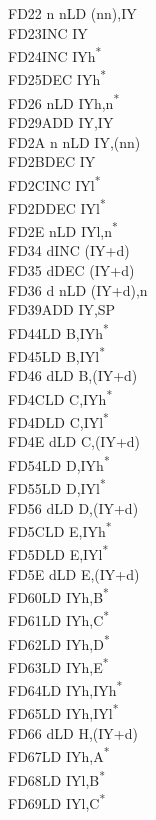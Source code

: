 \documentclass[oneside,a4paper]{book}
\begin{document}
\begin{multicols}{3}
{\begin{tabbing}
FD22 n n\>LD (nn),IY\\
FD23\>INC IY\\
FD24\>INC IYh\textsuperscript{*}\\
FD25\>DEC IYh\textsuperscript{*}\\
FD26 n\>LD IYh,n\textsuperscript{*}\\
FD29\>ADD IY,IY\\
FD2A n n\>LD IY,(nn)\\
FD2B\>DEC IY\\
FD2C\>INC IYl\textsuperscript{*}\\
FD2D\>DEC IYl\textsuperscript{*}\\
FD2E n\>LD IYl,n\textsuperscript{*}\\
FD34 d\>INC (IY+d)\\
FD35 d\>DEC (IY+d)\\
FD36 d n\>LD (IY+d),n\\
FD39\>ADD IY,SP\\
FD44\>LD B,IYh\textsuperscript{*}\\
FD45\>LD B,IYl\textsuperscript{*}\\
FD46 d\>LD B,(IY+d)\\
FD4C\>LD C,IYh\textsuperscript{*}\\
FD4D\>LD C,IYl\textsuperscript{*}\\
FD4E d\>LD C,(IY+d)\\
FD54\>LD D,IYh\textsuperscript{*}\\
FD55\>LD D,IYl\textsuperscript{*}\\
FD56 d\>LD D,(IY+d)\\
FD5C\>LD E,IYh\textsuperscript{*}\\
FD5D\>LD E,IYl\textsuperscript{*}\\
FD5E d\>LD E,(IY+d)\\
FD60\>LD IYh,B\textsuperscript{*}\\
FD61\>LD IYh,C\textsuperscript{*}\\
FD62\>LD IYh,D\textsuperscript{*}\\
FD63\>LD IYh,E\textsuperscript{*}\\
FD64\>LD IYh,IYh\textsuperscript{*}\\
FD65\>LD IYh,IYl\textsuperscript{*}\\
FD66 d\>LD H,(IY+d)\\
FD67\>LD IYh,A\textsuperscript{*}\\
FD68\>LD IYl,B\textsuperscript{*}\\
FD69\>LD IYl,C\textsuperscript{*}\\

\end{tabbing}}
\end{multicols}
\end{document}
